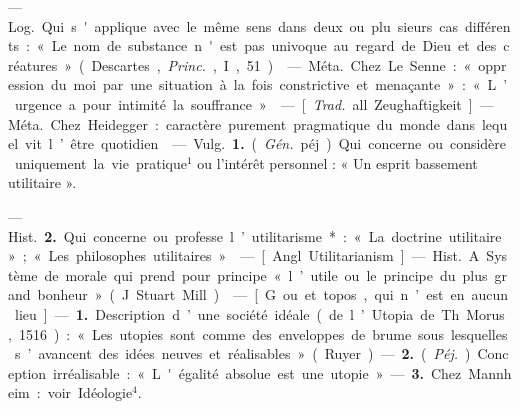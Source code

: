 \begin{itemize}[leftmargin=1cm, label=, itemsep=1pt]
 — \si{Log.} Qui s'applique avec
le même sens dans deux ou plu
sieurs cas différents : « Le nom de
substance n'est pas univoque au
regard de Dieu et des créatures »
(Descartes, {\it Princ.}, I, 51).

 — \si{Méta.} Chez Le Senne :
« oppression du moi par une situation à la fois constrictive et menaçante » : « L’urgence a pour intimité
la souffrance. »

 — [{\it Trad.} all. Zeughaftigkeit]
— \si{Méta.} Chez Heidegger : caractère
purement pragmatique du monde
dans lequel vit l’être quotidien.

 — \si{Vulg.} {\bf 1.} ({\it Gén.} péj.) Qui
concerne ou considère uniquement
la vie pratique$^1$ ou l'intérêt personnel : « Un esprit bassement utilitaire ».

— \si{Hist.} {\bf 2.} Qui concerne ou professe l’utilitarisme* : « La doctrine
utilitaire »; « Les philosophes utilitaires ».

 — [Angl. Utilitarianism] —
\si{Hist.} A. Système de morale qui
prend pour principe « l’utile ou le
principe du plus grand bonheur »
(J. Stuart Mill).

 — [G. ou et topos, qui n’est en
aucun lieu] — {\bf 1.} Description d’une
société idéale (de l’Utopia de Th. Morus, 1516) : « Les utopies sont comme
des enveloppes de brume sous lesquelles s’avancent des idées neuves
et réalisables » (Ruyer). — {\bf 2.} ({\it Péj.}).
Conception irréalisable : « L'égalité
absolue est une utopie ». — {\bf 3.} Chez
Mannheim : voir Idéologie$^4$.

	\end{itemize}
